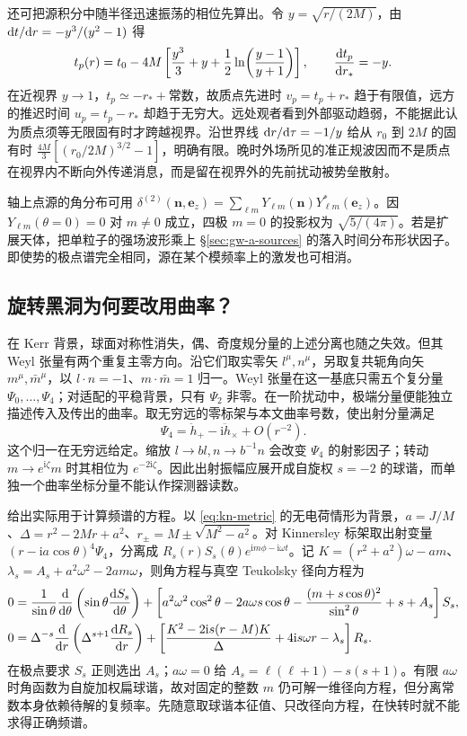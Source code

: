 还可把源积分中随半径迅速振荡的相位先算出。令 $y=\sqrt{r/(2M)}$，由 $\dd t/\dd r=-y^3/(y^2-1)$ 得
\[
 t_p(r)=t_0-4M\left[\frac{y^3}{3}+y+
                 \frac12\ln\!\left(\frac{y-1}{y+1}\right)\right],
 \qquad \frac{\dd t_p}{\dd r_*}=-y .
\]
在近视界 $y\to1$，$t_p\simeq-r_*+\text{常数}$，故质点先进时 $v_p=t_p+r_*$ 趋于有限值，远方的推迟时间 $u_p=t_p-r_*$ 却趋于无穷大。远处观者看到外部驱动趋弱，不能据此认为质点须等无限固有时才跨越视界。沿世界线 $\dd r/\dd\tau=-1/y$ 给从 $r_0$ 到 $2M$ 的固有时 $\tfrac{4M}{3}[(r_0/2M)^{3/2}-1]$，明确有限。晚时外场所见的准正规波因而不是质点在视界内不断向外传递消息，而是留在视界外的先前扰动被势垒散射。

轴上点源的角分布可用 $\delta^{(2)}(\bm n,\bm e_z)=\sum_{\ell m}Y_{\ell m}(\bm n)Y_{\ell m}^*(\bm e_z)$。因 $Y_{\ell m}(\theta=0)=0$ 对 $m\ne0$ 成立，四极 $m=0$ 的投影权为 $\sqrt{5/(4\pi)}$。若是扩展天体，把单粒子的强场波形乘上 \S\ref{sec:gw-a-sources} 的落入时间分布形状因子。即使势的极点谱完全相同，源在某个模频率上的激发也可相消。

\subsection{旋转黑洞为何要改用曲率？}

在 Kerr 背景，球面对称性消失，偶、奇度规分量的上述分离也随之失效。但其 Weyl 张量有两个重复主零方向。沿它们取实零矢 $l^\mu,n^\mu$，另取复共轭角向矢 $m^\mu,\bar m^\mu$，以 $l\cdot n=-1$、$m\cdot\bar m=1$ 归一。Weyl 张量在这一基底只需五个复分量 $\Psi_0,\ldots,\Psi_4$；对适配的平稳背景，只有 $\Psi_2$ 非零。在一阶扰动中，极端分量便能独立描述传入及传出的曲率。取无穷远的零标架与本文曲率号数，使出射分量满足
\begin{equation}
 \Psi_4=\ddot h_+-\mathrm i\ddot h_\times+O(r^{-2}).
 \label{eq:gw-cpsi}
\end{equation}
这个归一在无穷远给定。缩放 $l\to b l,n\to b^{-1}n$ 会改变 $\Psi_4$ 的射影因子；转动 $m\to e^{\mathrm i\zeta}m$ 时其相位为 $e^{-2\mathrm i\zeta}$。因此出射振幅应展开成自旋权 $s=-2$ 的球谐，而单独一个曲率坐标分量不能认作探测器读数。

给出实际用于计算频谱的方程。以 \eqref{eq:kn-metric} 的无电荷情形为背景，$a=J/M$、$\Delta=r^2-2Mr+a^2$、$r_\pm=M\pm\sqrt{M^2-a^2}$。对 Kinnersley 标架取出射变量 $(r-\mathrm ia\cos\theta)^4\Psi_4$，分离成 $R_s(r)S_s(\theta)e^{\mathrm i m\phi-\mathrm i\omega t}$。记 $K=(r^2+a^2)\omega-am$、$\lambda_s=A_s+a^2\omega^2-2am\omega$，则角方程与真空 Teukolsky 径向方程为
\begin{align*}
 0={}&\frac{1}{\sin\theta}\frac{\dd}{\dd\theta}
          \left(\sin\theta\frac{\dd S_s}{\dd\theta}\right)
 +\left[a^2\omega^2\cos^2\theta-2a\omega s\cos\theta
       -\frac{(m+s\cos\theta)^2}{\sin^2\theta}+s+A_s\right]S_s,\\
 0={}&\Delta^{-s}\frac{\dd}{\dd r}\left(\Delta^{s+1}\frac{\dd R_s}{\dd r}\right)
 +\left[\frac{K^2-2\mathrm is(r-M)K}{\Delta}
                     +4\mathrm is\omega r-\lambda_s\right]R_s .
\end{align*}
在极点要求 $S_s$ 正则选出 $A_s$；$a\omega=0$ 给 $A_s=\ell(\ell+1)-s(s+1)$。有限 $a\omega$ 时角函数为自旋加权扁球谐，故对固定的整数 $m$ 仍可解一维径向方程，但分离常数本身依赖待解的复频率。先随意取球谐本征值、只改径向方程，在快转时就不能求得正确频谱。

